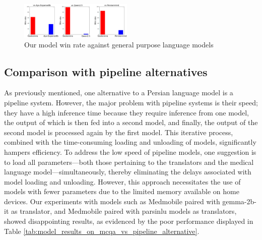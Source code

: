 \documentclass[conference]{IEEEtran}
\begin{document}
\begin{figure}[htbp]
	\centerline{\includegraphics[width=0.48\textwidth]{fig4.png}}
	\caption{Our model win rate against general purpose language models}
	\label{fig4}
\end{figure}
\subsection{Comparison with pipeline alternatives}
As previously mentioned, one alternative to a Persian language model is a pipeline system. However, the major problem with pipeline systems is their speed; they have a high inference time because they require inference from one model, the output of which is then fed into a second model, and finally, the output of the second model is processed again by the first model. This iterative process, combined with the time-consuming loading and unloading of models, significantly hampers efficiency. To address the low speed of pipeline models, one suggestion is to load all parameters—both those pertaining to the translators and the medical language model—simultaneously, thereby eliminating the delays associated with model loading and unloading. However, this approach necessitates the use of models with fewer parameters due to the limited memory available on home devices. Our experiments with models such as Medmobile 
\cite{b9}
paired with 
gemma-2b-it 
\cite{b14}
as translator, and Medmobile paired with parsinlu 
\cite{b31}
\cite{b32}
models as translators, showed disappointing results, as evidenced by the poor performance displayed in Table \ref{tab:model_results_on_mcqa_vs_pipeline_alternative}.
\end{document}
